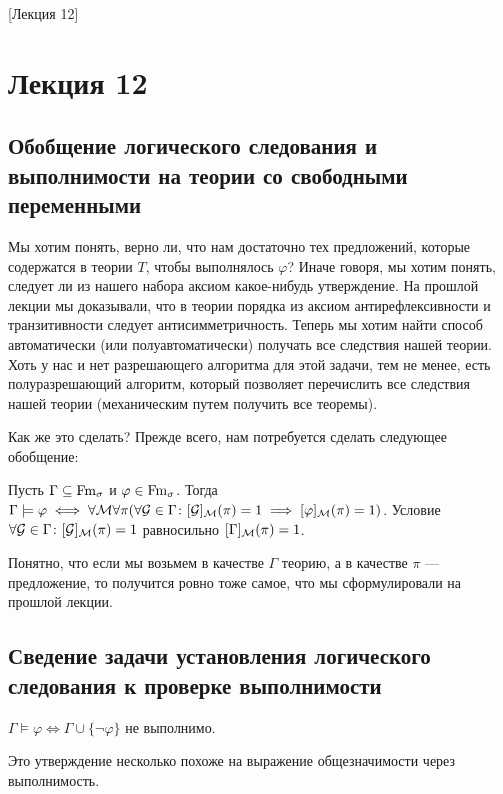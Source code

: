 [Лекция 12]

\section{Лекция 12}

\subsection{Обобщение логического следования и выполнимости на теории со свободными переменными}

Мы хотим понять, верно ли, что нам достаточно тех предложений, которые содержатся в теории $T$, чтобы выполнялось $\varphi$?
Иначе говоря, мы хотим понять, следует ли из нашего набора аксиом какое-нибудь утверждение.
На прошлой лекции мы доказывали, что в теории порядка из аксиом антирефлексивности и транзитивности следует антисимметричность.
Теперь мы хотим найти способ автоматически (или полуавтоматически) получать все следствия нашей теории.
Хоть у нас и нет разрешающего алгоритма для этой задачи, тем не менее, есть полуразрешающий алгоритм, который позволяет перечислить все следствия нашей теории (механическим путем получить все теоремы).

Как же это сделать?
Прежде всего, нам потребуется сделать следующее обобщение:
\begin{definition}
    Пусть $\Gamma \subseteq \mathrm{Fm}_{\sigma}$ и $\varphi \in \mathrm{Fm}_{\sigma}$.
    Тогда $\Gamma \models \varphi \iff \forall \mathcal{M} \forall \pi (\forall \mathcal{G} \in \Gamma \colon [\mathcal{G}]_{\mathcal{M}}(\pi) = 1 \implies [\varphi]_{\mathcal{M}}(\pi) = 1)$.
    Условие $\forall \mathcal{G} \in \Gamma \colon [\mathcal{G}]_{\mathcal{M}}(\pi) = 1$ равносильно $[\Gamma]_{\mathcal{M}}(\pi) = 1$.
\end{definition}
Понятно, что если мы возьмем в качестве $\Gamma$ теорию, а в качестве $\pi$ --- предложение, то получится ровно тоже самое, что мы сформулировали на прошлой лекции.

\subsection{Сведение задачи установления логического следования к проверке выполнимости}

\begin{statement}
    $\Gamma \models \varphi \iff \Gamma \cup \{\neg \varphi\}$ не выполнимо.
\end{statement}

Это утверждение несколько похоже на выражение общезначимости через выполнимость.

